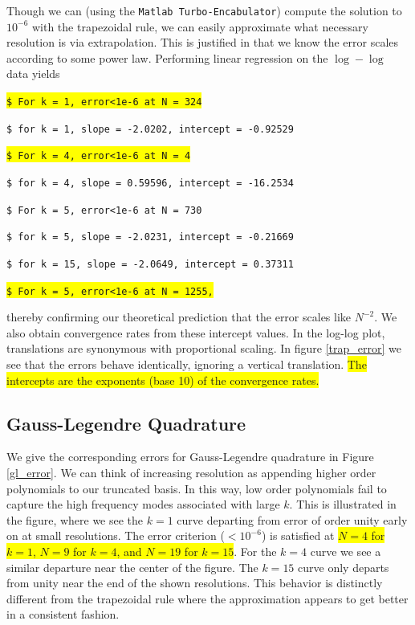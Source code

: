 \documentclass[10pt]{article}
\begin{document}
Though we can (using the \texttt{Matlab Turbo-Encabulator}) compute the solution to $10^{-6}$ with the trapezoidal rule, we can easily approximate what necessary resolution is via extrapolation. This is justified in that we know the error scales according to some power law. Performing linear regression on the $\log-\log$ data yields
\vspace{0.15cm}

\texttt{\colorbox{yellow}{\$  For k = 1, error<1e-6 at N = 324}}
\vspace{0.15cm}

\texttt{\$  for k = 1, slope = -2.0202, intercept = -0.92529}
\vspace{0.15cm}

\texttt{\colorbox{yellow}{\$  For k = 4, error<1e-6 at N = 4}}
\vspace{0.15cm}

\texttt{\$  for k = 4, slope = 0.59596, intercept = -16.2534}
\vspace{0.15cm}

\texttt{\$  For k = 5, error<1e-6 at N = 730}
\vspace{0.15cm}

\texttt{\$  for k = 5, slope = -2.0231, intercept = -0.21669}
\vspace{0.15cm}

\texttt{\$  for k = 15, slope = -2.0649, intercept = 0.37311}
\vspace{0.15cm}

\texttt{\colorbox{yellow}{\$  For k = 5, error<1e-6 at N = 1255,}}
\vspace{0.15cm}

thereby confirming our theoretical prediction that the error scales like $N^{-2}$. We also obtain convergence rates from these intercept values. In the log-log plot, translations are synonymous with proportional scaling. In figure \ref{trap_error} we see that the errors behave identically, ignoring a vertical translation. \colorbox{yellow}{The intercepts are the exponents (base 10) of the convergence rates.}

\subsection*{Gauss-Legendre Quadrature}

We give the corresponding errors for Gauss-Legendre quadrature in Figure \ref{gl_error}. We can think of increasing resolution as appending higher order polynomials to our truncated basis. In this way, low order polynomials fail to capture the high frequency modes associated with large $k$. This is illustrated in the figure, where we see the $k = 1$ curve departing from error of order unity early on at small resolutions. The error criterion ($< 10^{-6}$) is satisfied at \colorbox{yellow}{$N = 4$ for $k=1$, $N = 9$ for $k = 4$, and $N = 19$ for $k = 15$}. For the $k = 4$ curve we see a similar departure near the center of the figure. The $k = 15$ curve only departs from unity near the end of the shown resolutions. This behavior is distinctly different from the trapezoidal rule where the approximation appears to get better in a consistent fashion.
\end{document}
